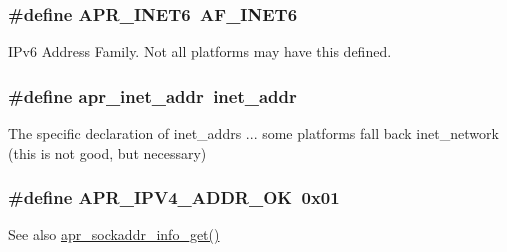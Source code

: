 \subsubsection[{\texorpdfstring{A\+P\+R\+\_\+\+I\+N\+E\+T6}{APR_INET6}}]{\setlength{\rightskip}{0pt plus 5cm}\#define A\+P\+R\+\_\+\+I\+N\+E\+T6~A\+F\+\_\+\+I\+N\+E\+T6}\hypertarget{group__apr__network__io_gad09d9ea8995f50f35073ae0c77efb44f}{}\label{group__apr__network__io_gad09d9ea8995f50f35073ae0c77efb44f}
I\+Pv6 Address Family. Not all platforms may have this defined. 
\subsubsection[{\texorpdfstring{apr\+\_\+inet\+\_\+addr}{apr_inet_addr}}]{\setlength{\rightskip}{0pt plus 5cm}\#define apr\+\_\+inet\+\_\+addr~inet\+\_\+addr}\hypertarget{group__apr__network__io_ga46a8b06887871cfd60a3e37385775e22}{}\label{group__apr__network__io_ga46a8b06887871cfd60a3e37385775e22}
The specific declaration of inet\+\_\+addr\textquotesingle{}s ... some platforms fall back inet\+\_\+network (this is not good, but necessary) 
\subsubsection[{\texorpdfstring{A\+P\+R\+\_\+\+I\+P\+V4\+\_\+\+A\+D\+D\+R\+\_\+\+OK}{APR_IPV4_ADDR_OK}}]{\setlength{\rightskip}{0pt plus 5cm}\#define A\+P\+R\+\_\+\+I\+P\+V4\+\_\+\+A\+D\+D\+R\+\_\+\+OK~0x01}\hypertarget{group__apr__network__io_ga58aa30a94127b4a80f27fbf2e03fdfd8}{}\label{group__apr__network__io_ga58aa30a94127b4a80f27fbf2e03fdfd8}
\begin{DoxySeeAlso}{See also}
\hyperlink{group__apr__network__io_gaa2f399ca2b60b35c0abf7630298c6c9f}{apr\+\_\+sockaddr\+\_\+info\+\_\+get()} 
\end{DoxySeeAlso}
